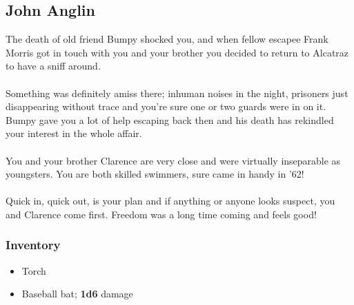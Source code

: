 \documentclass[12pt,a4paper]{article}
\begin{document}
\subsection*{John Anglin}
The death of old friend Bumpy shocked you, and when fellow escapee Frank Morris got in touch with you and your brother you decided to return to Alcatraz to have a sniff around.\\\\
Something was definitely amiss there; inhuman noises in the night, prisoners just disappearing without trace and you're sure one or two guards were in on it.  Bumpy gave you a lot of help escaping back then and his death has rekindled your interest in the whole affair.\\\\
You and your brother Clarence are very close and were virtually inseparable as youngsters.  You are both skilled swimmers, sure came in handy in '62!\\\\
Quick in, quick out, is your plan and if anything or anyone looks suspect, you and Clarence come first.  Freedom was a long time coming and feels good!
\subsubsection*{Inventory}
\begin{itemize}
\item{Torch}
\item{Baseball bat; \textbf{1d6} damage}
\end{itemize}

\end{document}
